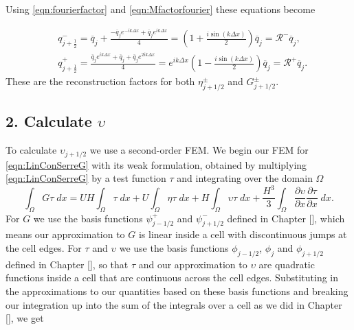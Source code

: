 Using \eqref{eqn:fourierfactor} and \eqref{eqn:Mfactorfourier} these equations become

\begin{subequations}
	\label{eqn:RpmfactorFDVM}
	\begin{align}
	&q^-_{j+\frac{1}{2}} =\overline{q}_j + \frac{- \overline{q}_{j} e^{-ik\Delta x} + \overline{q}_{j} e^{ik\Delta x}}{4} = \left(1  + \frac{i\sin\left(k\Delta x\right)}{2} \right)\overline{q}_{j} =\mathcal{R}^- \overline{q}_{j},\\
	&q^+_{j+\frac{1}{2}}= \frac{\overline{q}_{j}e^{ik\Delta x} + \overline{q}_{j} + \overline{q}_{j}e^{2ik\Delta x} }{4} = e^{ik\Delta x}\left(1  - \frac{i\sin\left(k\Delta x\right)}{2} \right)\overline{q}_{j} = \mathcal{R}^+ \overline{q}_{j}.
	\end{align}
\end{subequations}
These are the reconstruction factors for both $\eta^{\pm}_{j+1/2}$ and $G^{\pm}_{j+1/2}$.

\subsection{2. Calculate $\upsilon$}
To calculate $\upsilon_{j+1/2}$ we use a second-order FEM. We begin our FEM for \eqref{eqn:LinConSerreG} with its weak formulation, obtained by multiplying \eqref{eqn:LinConSerreG} by a test function $\tau$ and integrating over the domain $\Omega$
\begin{equation*}
\int_{\Omega}G \tau \; dx = UH\int_{\Omega} \tau \; dx + U \int_{\Omega} \eta \tau \; dx +   H\int_{\Omega} \upsilon \tau \; dx  + \frac{H^3}{3} \int_{\Omega} \frac{\partial \upsilon}{\partial x } \frac{\partial \tau}{\partial x }\; dx.
\end{equation*}
For $G$ we use the basis functions $\psi^+_{j - 1/2}$ and $\psi^-_{j + 1/2}$ defined in Chapter [], which means our approximation to $G$ is linear inside a cell with discontinuous jumps at the cell edges. For $\tau$ and $\upsilon$ we use the basis functions $\phi_{j-1/2}$, $\phi_{j}$ and $\phi_{j+1/2}$ defined in Chapter [], so that $\tau$ and our approximation to $\upsilon$ are quadratic functions inside a cell that are continuous across the cell edges. Substituting in the approximations to our quantities based on these basis functions and breaking our integration up into the sum of the integrals over a cell as we did in Chapter [], we get


